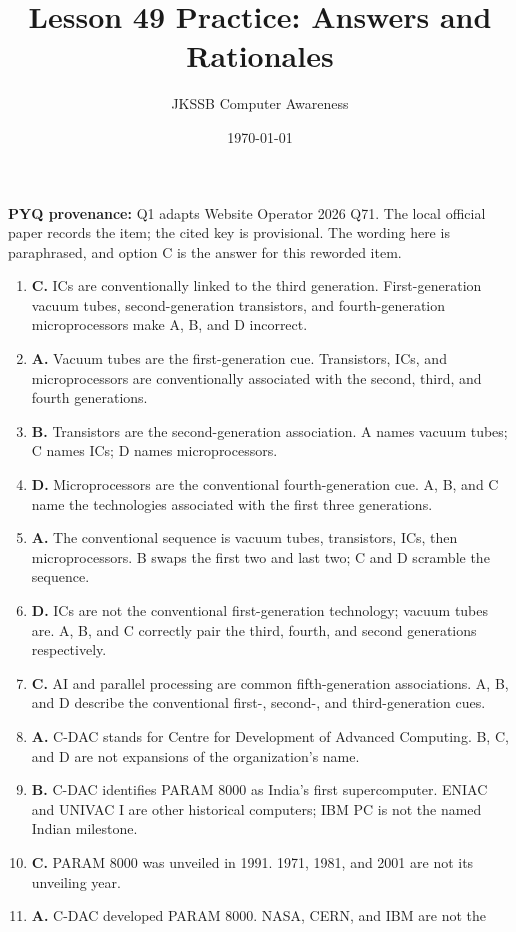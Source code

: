 \documentclass[11pt]{article}
\title{Lesson 49 Practice: Answers and Rationales}
\author{JKSSB Computer Awareness}
\date{\today}
\begin{document}
\maketitle
\noindent\textbf{PYQ provenance:} Q1 adapts Website Operator 2026 Q71.
The local official paper records the item; the cited key is provisional.
The wording here is paraphrased, and option C is the answer for this
reworded item.
\begin{enumerate}[label=\textbf{Q\arabic*.}, leftmargin=*]
\item \textbf{C.} ICs are conventionally linked to the third generation.
  First-generation vacuum tubes, second-generation transistors, and
  fourth-generation microprocessors make A, B, and D incorrect.
\item \textbf{A.} Vacuum tubes are the first-generation cue. Transistors,
  ICs, and microprocessors are conventionally associated with the second,
  third, and fourth generations.
\item \textbf{B.} Transistors are the second-generation association. A names
  vacuum tubes; C names ICs; D names microprocessors.
\item \textbf{D.} Microprocessors are the conventional fourth-generation
  cue. A, B, and C name the technologies associated with the first three
  generations.
\item \textbf{A.} The conventional sequence is vacuum tubes, transistors,
  ICs, then microprocessors. B swaps the first two and last two; C and D
  scramble the sequence.
\item \textbf{D.} ICs are not the conventional first-generation technology;
  vacuum tubes are. A, B, and C correctly pair the third, fourth, and second
  generations respectively.
\item \textbf{C.} AI and parallel processing are common fifth-generation
  associations. A, B, and D describe the conventional first-, second-, and
  third-generation cues.
\item \textbf{A.} C-DAC stands for Centre for Development of Advanced
  Computing. B, C, and D are not expansions of the organization's name.
\item \textbf{B.} C-DAC identifies PARAM 8000 as India's first
  supercomputer. ENIAC and UNIVAC I are other historical computers; IBM PC
  is not the named Indian milestone.
\item \textbf{C.} PARAM 8000 was unveiled in 1991. 1971, 1981, and 2001 are
  not its unveiling year.
\item \textbf{A.} C-DAC developed PARAM 8000. NASA, CERN, and IBM are not the

\end{enumerate}
\end{document}
